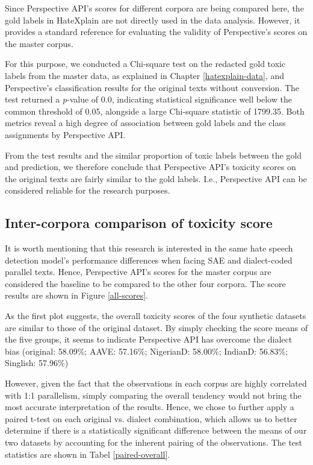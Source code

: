 \documentclass[11pt]{article}
\begin{document}
Since Perspective API’s scores for different corpora are being compared here, the gold labels in HateXplain are not directly used in the data analysis. However, it provides a standard reference for evaluating the validity of Perspective’s scores on the master corpus.

For this purpose, we conducted a Chi-square test on the redacted gold toxic labels from the master data, as explained in Chapter \ref{hatexplain-data}, and Perspective’s classification results for the original texts without conversion. The test returned a \textit{p}-value of 0.0, indicating statistical significance well below the common threshold of 0.05, alongside a large Chi-square statistic of 1799.35. Both metrics reveal a high degree of association between gold labels and the class assignments by Perspective API.

From the test results and the similar proportion of toxic labels between the gold and prediction, we therefore conclude that Perspective API’s toxicity scores on the original texts are fairly similar to the gold labels. I.e., Perspective API can be considered reliable for the research purposes.

\subsection{Inter-corpora comparison of toxicity score}

It is worth mentioning that this research is interested in the same hate speech detection model’s performance differences when facing SAE and dialect-coded parallel texts. Hence, Perspective API’s scores for the master corpus are considered the baseline to be compared to the other four corpora. The score results are shown in Figure \ref{all-scores}.

As the first plot suggests, the overall toxicity scores of the four synthetic datasets are similar to those of the original dataset. By simply checking the score means of the five groups, it seems to indicate Perspective API has overcome the dialect bias (original: 58.09\%; AAVE: 57.16\%; NigerianD: 58.00\%; IndianD: 56.83\%; Singlish: 57.96\%)

However, given the fact that the observations in each corpus are highly correlated with 1:1 parallelism, simply comparing the overall tendency would not bring the most accurate interpretation of the results. Hence, we chose to further apply a paired t-test on each original vs. dialect combination, which allows us to better determine if there is a statistically significant difference between the means of our two datasets by accounting for the inherent pairing of the observations. The test statistics are shown in Tabel \ref{paired-overall}.
\end{document}
